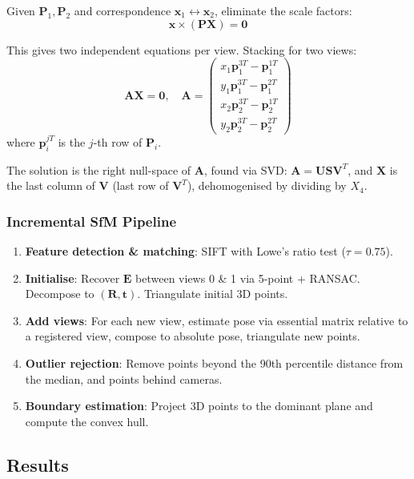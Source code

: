 \documentclass[12pt, a4paper]{article}
\begin{document}
Given $\mathbf{P}_1, \mathbf{P}_2$ and correspondence $\mathbf{x}_1 \leftrightarrow \mathbf{x}_2$, eliminate the scale factors:
\[
  \mathbf{x} \times (\mathbf{P} \mathbf{X}) = \mathbf{0}
\]

This gives two independent equations per view.  Stacking for two views:
\[
  \mathbf{A} \mathbf{X} = \mathbf{0}, \quad
  \mathbf{A} = \begin{pmatrix}
    x_1 \mathbf{p}_1^{3T} - \mathbf{p}_1^{1T} \\
    y_1 \mathbf{p}_1^{3T} - \mathbf{p}_1^{2T} \\
    x_2 \mathbf{p}_2^{3T} - \mathbf{p}_2^{1T} \\
    y_2 \mathbf{p}_2^{3T} - \mathbf{p}_2^{2T}
  \end{pmatrix}
\]
where $\mathbf{p}_i^{jT}$ is the $j$-th row of $\mathbf{P}_i$.

The solution is the right null-space of $\mathbf{A}$, found via SVD: $\mathbf{A} = \mathbf{U}\mathbf{S}\mathbf{V}^T$, and $\mathbf{X}$ is the last column of $\mathbf{V}$ (last row of $\mathbf{V}^T$), dehomogenised by dividing by $X_4$.

\subsubsection{Incremental SfM Pipeline}

\begin{enumerate}
  \item \textbf{Feature detection \& matching}: SIFT with Lowe's ratio test ($\tau = 0.75$).
  \item \textbf{Initialise}: Recover $\mathbf{E}$ between views 0 \& 1 via 5-point + RANSAC.  Decompose to $(\mathbf{R}, \mathbf{t})$.  Triangulate initial 3D points.
  \item \textbf{Add views}: For each new view, estimate pose via essential matrix relative to a registered view, compose to absolute pose, triangulate new points.
  \item \textbf{Outlier rejection}: Remove points beyond the 90th percentile distance from the median, and points behind cameras.
  \item \textbf{Boundary estimation}: Project 3D points to the dominant plane and compute the convex hull.
\end{enumerate}

\subsection{Results}
\end{document}
